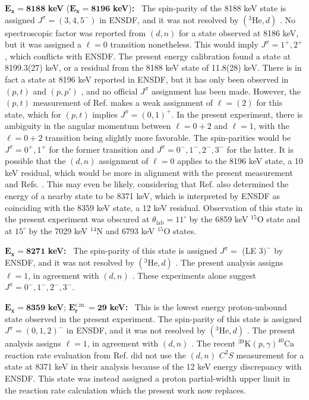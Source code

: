 \emph{$\mathbf{E_{x} = 8188}$} \textbf{keV} (\emph{$\mathbf{E_{x} = 8196}$} \textbf{keV})\textbf{:} \, 
The spin-parity of the 8188 keV state is assigned $J^{\pi} = (3,4,5^{-})$ in ENSDF, and it was not resolved by $(^{3}\mathrm{He},d)$ \cite{Erskine1966,Seth1967,Cage1971}. No spectroscopic factor was reported from $(d,n)$ \cite{Fuchs1969} for a state observed at 8186 keV, but it was assigned a $\ell=0$ transition nonetheless. This would imply $J^{\pi} = 1^{+},2^{+}$, which conflicts with ENSDF. The present energy calibration found a state at 8199.3(27) keV, or a residual from the 8188 keV state of 11.8(28) keV. There is in fact a state at 8196 keV reported in ENSDF, but it has only been observed in $(p,t)$ \cite{Seth1974,Seth1977} and $(p,p')$ \cite{Nolen1975}, and no official $J^{\pi}$ assignment has been made. However, the $(p,t)$ measurement of Ref. \cite{Seth1977} makes a weak assignment of $\ell=(2)$ for this state, which for $(p,t)$ implies $J^{\pi} = (0,1)^{+}$. In the present experiment, there is ambiguity in the angular momentum between $\ell=0+2$ and $\ell=1$, with the $\ell=0+2$ transition being slightly more favorable. The spin-parities would be $J^{\pi} = 0^{+},1^{+}$ for the former transition and $J^{\pi} = 0^{-},1^{-},2^{-},3^{-}$ for the latter. It is possible that the $(d,n)$ \cite{Fuchs1969} assignment of $\ell=0$ applies to the 8196 keV state, a 10 keV residual, which would be more in alignment with the present measurement and Refs. \cite{Seth1974,Seth1977,Nolen1975}. This may even be likely, considering that Ref. \cite{Fuchs1969} also determined the energy of a nearby state to be 8371 keV, which is interpreted by ENSDF as coinciding with the 8359 keV state, a 12 keV residual. Observation of this state in the present experiment was obscured at $\theta_{\mathrm{lab}} = 11^{\circ}$ by the 6859 keV $^{15}$O state and at $15^{\circ}$ by the 7029 keV $^{14}$N and 6793 keV $^{15}$O states.

\emph{$\mathbf{E_{x} = 8271}$} \textbf{keV:} \, 
The spin-parity of this state is assigned $J^{\pi} =$ (LE $3)^{-}$ by ENSDF, and it was not resolved by $(^{3}\mathrm{He},d)$ \cite{Erskine1966,Seth1967,Cage1971}. The present analysis assigns $\ell=1$, in agreement with $(d,n)$ \cite{Fuchs1969}. These experiments alone suggest $J^{\pi} = 0^{-},1^{-},2^{-},3^{-}$.

\emph{$\mathbf{E_{x} = 8359}$} \textbf{keV}; \emph{$\mathbf{E^{\boldsymbol{\mathrm{c.m.}}}_{r} = 29}$} \textbf{keV:} \, 
This is the lowest energy proton-unbound state observed in the present experiment. The spin-parity of this state is assigned $J^{\pi} = (0, 1, 2)^{-}$ in ENSDF, and it was not resolved by $(^{3}\mathrm{He},d)$ \cite{Erskine1966,Seth1967,Cage1971}. The present analysis assigns $\ell=1$, in agreement with $(d,n)$ \cite{Fuchs1969}. The recent  $^{39}\mathrm{K}(p, \gamma)^{40}\mathrm{Ca}$ reaction rate evaluation from Ref. \cite{Longland2018} did not use the $(d,n)$ \cite{Fuchs1969} $C^{2}S$ measurement for a state at 8371 keV in their analysis because of the 12 keV energy discrepancy with ENSDF. This state was instead assigned a proton partial-width upper limit in the reaction rate calculation which the present work now replaces.

